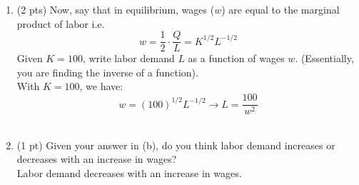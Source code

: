 \documentclass{./../../../Latex/tests}
\begin{document}
\begin{enumerate}
\begin{enumerate}
\item (2 pts) Now, say that in equilibrium, wages ($w$) are equal to the marginal product of labor i.e.
$$ w = \frac{1}{2}\cdot \frac{Q}{L} = K^{1/2}L^{-1/2}   $$
Given $K=100$, write labor demand $L$ as a function of wages $w$. (Essentially, you are finding the inverse of a function). \\

With $K=100$, we have:
$$ w = (100)^{1/2} L^{-1/2} \rightarrow  L = \frac{100}{w^2}$$ \\

\item (1 pt) Given your answer in (b), do you think labor demand increases or decreases with an increase in wages? \\
Labor demand decreases with an increase in wages.
\end{enumerate}

\end{enumerate}
\end{document}
